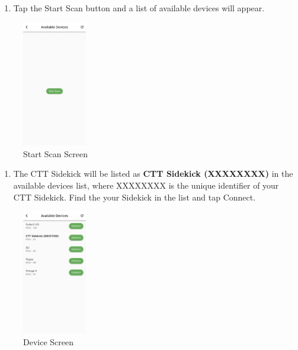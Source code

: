 \documentclass[
]{article}
\providecommand{\tightlist}{%
  \setlength{\itemsep}{0pt}\setlength{\parskip}{0pt}}
\begin{document}
\begin{enumerate}
\def\labelenumi{\arabic{enumi}.}
\setcounter{enumi}{1}
\tightlist
\item
  Tap the Start Scan button and a list of available devices will appear.
\end{enumerate}

\begin{figure}
\hypertarget{id}{%
\centering
\includegraphics[width=0.25\textwidth,height=\textheight]{./images/CTT Mobile_2.jpg}
\caption{Start Scan Screen}\label{id}
}
\end{figure}

\begin{enumerate}
\def\labelenumi{\arabic{enumi}.}
\setcounter{enumi}{2}
\tightlist
\item
  The CTT Sidekick will be listed as \textbf{CTT Sidekick (XXXXXXXX)} in
  the available devices list, where XXXXXXXX is the unique identifier of
  your CTT Sidekick. Find the your Sidekick in the list and tap Connect.
\end{enumerate}

\begin{figure}
\hypertarget{id}{%
\centering
\includegraphics[width=0.25\textwidth,height=\textheight]{./images/CTT Mobile_3.jpg}
\caption{Device Screen}\label{id}
}
\end{figure}
\end{document}
